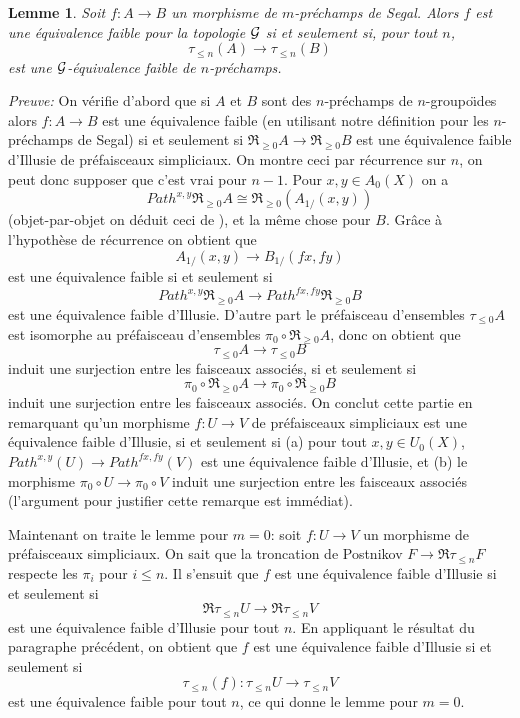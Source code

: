 \documentclass[12pt]{article}
\newtheorem{lemme}[lemma]{Lemme}
\newcommand{\Gg}{{\cal G}}
\begin{document}
\begin{lemme}
\label{compatible}
Soit $f:A\rightarrow B$ un morphisme de $m$-pr\'echamps de Segal. Alors
$f$ est une \'equivalence faible pour la topologie $\Gg$ si et seulement si,
pour tout $n$,
$$
\tau _{\leq n} (A)\rightarrow
\tau _{\leq n} (B)
$$
est une $\Gg$-\'equivalence faible de $n$-pr\'echamps.
\end{lemme}
{\em Preuve:}
On v\'erifie d'abord que si $A$ et $B$ sont des  $n$-pr\'echamps de
$n$-groupo\"{\i}des
alors $f:A\rightarrow B$ est une \'equivalence faible (en utilisant notre
d\'efinition pour les $n$-pr\'echamps de Segal) si et seulement si $\Re
_{\geq 0} A
\rightarrow \Re _{\geq 0}B$ est une \'equivalence faible d'Illusie de
pr\'efaisceaux simpliciaux. On montre ceci par r\'ecurrence sur $n$, on peut
donc supposer que c'est vrai pour $n-1$. Pour $x,y\in A_0(X)$ on a
$$
Path ^{x,y} \Re _{\geq 0} A \cong \Re _{\geq 0} (A_{1/}(x,y))
$$
(objet-par-objet on d\'eduit ceci de \cite{Tamsamani}), et la m\^eme chose pour
$B$. Gr\^ace \`a l'hypoth\`ese de r\'ecurrence on obtient que
$$
A_{1/}(x,y) \rightarrow B_{1/}(fx,fy)
$$
est une \'equivalence faible si et seulement si
$$
Path ^{x,y} \Re _{\geq 0} A \rightarrow Path ^{fx,fy} \Re _{\geq 0} B
$$
est une \'equivalence faible d'Illusie. D'autre part le pr\'efaisceau
d'ensembles
$\tau _{\leq 0} A$ est isomorphe au pr\'efaisceau d'ensembles $\pi _0\circ
\Re _{\geq 0} A$, donc on obtient que
$$
\tau _{\leq 0} A\rightarrow \tau _{\leq 0} B
$$
induit une surjection entre les faisceaux associ\'es, si et seulement si
$$
\pi _0\circ
\Re _{\geq 0} A\rightarrow \pi _0\circ
\Re _{\geq 0} B
$$
induit une surjection entre les faisceaux associ\'es.
On conclut cette partie en remarquant qu'un morphisme $f:U\rightarrow V$ de
pr\'efaisceaux simpliciaux est une \'equivalence faible d'Illusie, si et
seulement
si (a) pour tout $x,y\in U_0(X)$, $Path ^{x,y}(U)\rightarrow Path^{fx,fy}(V)$
est une \'equivalence faible d'Illusie, et  (b) le morphisme $\pi _0\circ
U\rightarrow \pi _0\circ V$ induit une surjection entre les faisceaux associ\'es
(l'argument pour justifier cette remarque est imm\'ediat).

Maintenant on traite le lemme pour $m=0$: soit $f: U\rightarrow V$ un morphisme
de pr\'efaisceaux simpliciaux. On sait que la troncation de Postnikov
$F \rightarrow\Re \tau _{\leq n}F$ respecte
les $\pi _i$ pour $i\leq n$. Il s'ensuit que $f$ est une \'equivalence faible
d'Illusie si et seulement si
$$
\Re \tau _{\leq n}U\rightarrow \Re \tau _{\leq n}V
$$
est une \'equivalence faible d'Illusie pour tout $n$. En appliquant le
r\'esultat du paragraphe pr\'ec\'edent, on obtient que $f$ est
une \'equivalence faible d'Illusie
si et seulement si
$$
\tau _{\leq n}(f):\tau _{\leq n}U\rightarrow  \tau _{\leq
n}V
$$
est une \'equivalence faible pour tout $n$, ce qui donne le lemme pour $m=0$.
\end{document}
